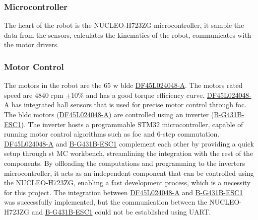 

\subsubsection{Microcontroller}
The heart of the robot is the NUCLEO-H723ZG microcontroller, it sample the data from the sensors, calculates the kinematics of the robot, communicates with the motor drivers.

\subsubsection{Motor Control}
The motors in the robot are the \(65\) \ac{w} \ac{bldc} \hyperlink{bom:DF45L024048-A}{DF45L024048-A}. The motors rated speed are \(4840\) \ac{rpm} \(\pm 10\%\) and has a good torque efficiency curve. \hyperlink{bom:DF45L024048-A}{DF45L024048-A} has integrated hall sensors that is used for precise motor control through \ac{foc}.
The \ac{bldc} motors (\hyperlink{bom:DF45L024048-A}{DF45L024048-A}) are controlled using an inverter (\hyperlink{bom:B-G431B-ESC1}{B-G431B-ESC1}). The inverter hosts a programmable STM32 microcontroller, capable of running motor control algorithms such as \ac{foc} and 6-step commutation.
\hyperlink{bom:DF45L024048-A}{DF45L024048-A} and \hyperlink{bom:B-G431B-ESC1}{B-G431B-ESC1} complement each other by providing a quick setup through \ac{st} MC workbench, streamlining the integration with the rest of the components. By offloading the computations and programming to the inverters microcontroller, it acts as an independent component that can be controlled using the NUCLEO-H723ZG, enabling a fast development process, which is a necessity for this project.
The integration between \hyperlink{bom:DF45L024048-A}{DF45L024048-A} and \hyperlink{bom:B-G431B-ESC1}{B-G431B-ESC1} was successfully implemented, but the communication between the NUCLEO-H723ZG and \hyperlink{bom:B-G431B-ESC1}{B-G431B-ESC1} could not be established using \ac{UART}.

